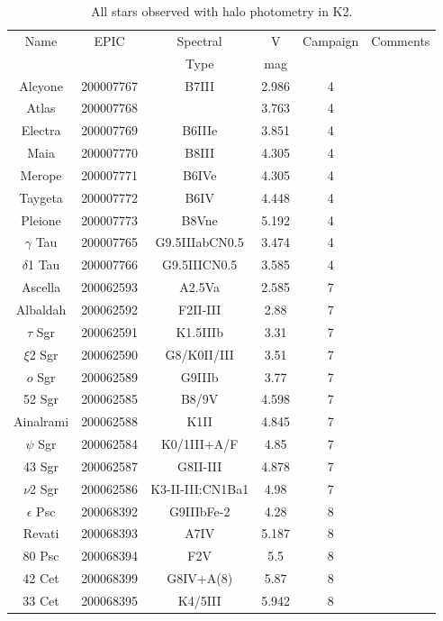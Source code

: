 \begin{table*}
\caption{All stars observed with halo photometry in K2.\label{table_all}}
\begin{tabular}{cccccc}
\hline \hline
Name & EPIC & Spectral & V & Campaign & Comments \\
 &  & Type & mag &  &  \\
\hline
Alcyone & 200007767 & B7III & 2.986 & 4 & \citet{White2017} \\
Atlas & 200007768 &  & 3.763 & 4 & \citet{White2017} \\
Electra & 200007769 & B6IIIe & 3.851 & 4 & \citet{White2017} \\
Maia & 200007770 & B8III & 4.305 & 4 & \citet{White2017} \\
Merope & 200007771 & B6IVe & 4.305 & 4 & \citet{White2017} \\
Taygeta & 200007772 & B6IV & 4.448 & 4 & \citet{White2017} \\
Pleione & 200007773 & B8Vne & 5.192 & 4 & \citet{White2017} \\
$\gamma$ Tau & 200007765 & G9.5IIIabCN0.5 & 3.474 & 4 &  \\
$\delta$1 Tau & 200007766 & G9.5IIICN0.5 & 3.585 & 4 &  \\
Ascella & 200062593 & A2.5Va & 2.585 & 7 &  \\
Albaldah & 200062592 & F2II-III & 2.88 & 7 &  \\
$\tau$ Sgr & 200062591 & K1.5IIIb & 3.31 & 7 &  \\
$\xi$2 Sgr & 200062590 & G8/K0II/III & 3.51 & 7 &  \\
$o$ Sgr & 200062589 & G9IIIb & 3.77 & 7 &  \\
52 Sgr & 200062585 & B8/9V & 4.598 & 7 &  \\
Ainalrami & 200062588 & K1II & 4.845 & 7 &  \\
$\psi$ Sgr & 200062584 & K0/1III+A/F & 4.85 & 7 &  \\
43 Sgr & 200062587 & G8II-III & 4.878 & 7 &  \\
$\nu$2 Sgr & 200062586 & K3-II-III:CN1Ba1 & 4.98 & 7 &  \\
$\epsilon$ Psc & 200068392 & G9IIIbFe-2 & 4.28 & 8 &  \\
Revati & 200068393 & A7IV & 5.187 & 8 &  \\
80 Psc & 200068394 & F2V & 5.5 & 8 &  \\
42 Cet & 200068399 & G8IV+A(8) & 5.87 & 8 &  \\
33 Cet & 200068395 & K4/5III & 5.942 & 8 &  \\

\end{tabular}
\end{table*}
